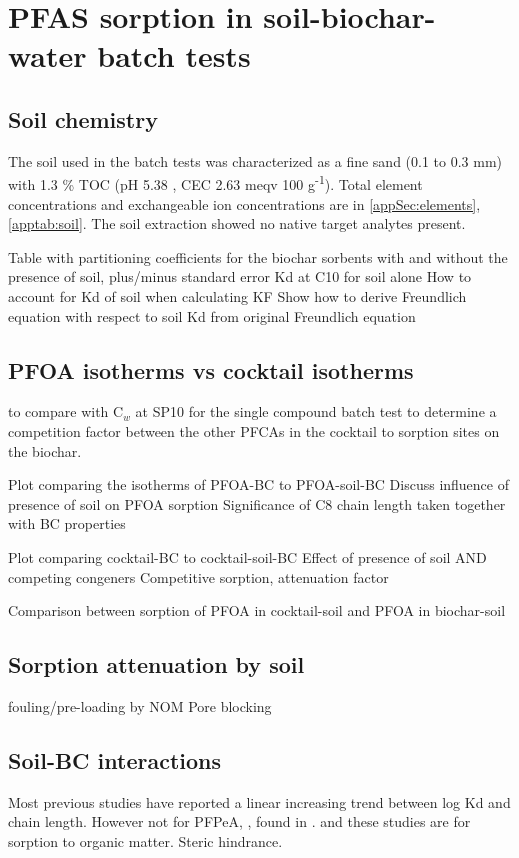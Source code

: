 \section{PFAS sorption in soil-biochar-water batch tests}
\subsection{Soil chemistry}
The soil used in the batch tests was characterized as a fine sand (0.1 to 0.3 mm) with 1.3 \% TOC (pH 5.38 , CEC 2.63  meqv 100 g\textsuperscript{-1}). Total element concentrations and exchangeable ion concentrations are in \cref{appSec:elements}, \cref{apptab:soil}. The soil extraction showed no native target analytes present.  


Table with partitioning coefficients for the biochar sorbents with and without the presence of soil, plus/minus standard error
Kd at C10 for soil alone
How to account for Kd of soil when calculating KF 
    Show how to derive Freundlich equation with respect to soil Kd from original Freundlich equation
    
\subsection{PFOA isotherms vs cocktail isotherms}
to compare with C$_w$ at SP10 for the single compound batch test to determine a competition factor between the other PFCAs in the cocktail to sorption sites on the biochar.

Plot comparing the isotherms of PFOA-BC to PFOA-soil-BC
Discuss influence of presence of soil on PFOA sorption
Significance of C8 chain length taken together with BC properties 

Plot comparing cocktail-BC to cocktail-soil-BC
Effect of presence of soil AND competing congeners
Competitive sorption, attenuation factor

Comparison between sorption of PFOA in cocktail-soil and PFOA in biochar-soil

\subsection{Sorption attenuation by soil}
fouling/pre-loading by NOM
Pore blocking

\subsection{Soil-BC interactions}
Most previous studies have reported a linear increasing trend between log Kd and chain length. However not for PFPeA, \citep{zhang2013sorption}, found in \citep{Sorengard2019}. and \citep{guelfo2013}  these studies are for sorption to organic matter.  Steric hindrance. 

